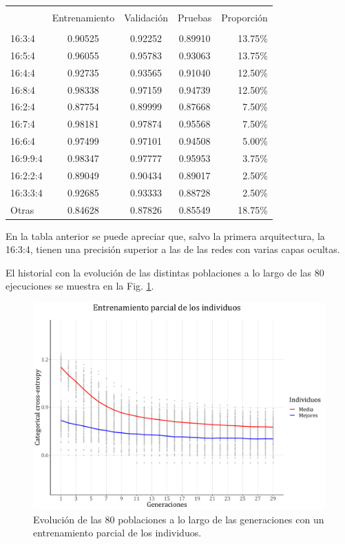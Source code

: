 \documentclass[spanish,a4paper,12pt,twoside]{report}
\begin{document}
\begin{center}
   \label{table}
  \begin{tabular}{l c c c r}
    \hline \\ [-2ex]
    & Entrenamiento & Validación & Pruebas & Proporción \\ [0.5ex]
    \hline \\ [-1ex]
    16:3:4 & 0.90525 & 0.92252 & 0.89910 & 13.75\% \\
    16:5:4 & 0.96055 & 0.95783 & 0.93063 & 13.75\% \\
    16:4:4 & 0.92735 & 0.93565 & 0.91040 & 12.50\% \\
    16:8:4 & 0.98338 & 0.97159 & 0.94739 & 12.50\% \\
    16:2:4 & 0.87754 & 0.89999 & 0.87668 & 7.50\% \\
    16:7:4 & 0.98181 & 0.97874 & 0.95568 & 7.50\% \\
    16:6:4 & 0.97499 & 0.97101 & 0.94508 & 5.00\% \\
    16:9:9:4 & 0.98347 & 0.97777 & 0.95953 & 3.75\% \\
    16:2:2:4 & 0.89049 & 0.90434 & 0.89017 & 2.50\% \\
    16:3:3:4 & 0.92685 & 0.93333 & 0.88728 & 2.50\% \\
    Otras & 0.84628 & 0.87826 & 0.85549 & 18.75\% \\ [1ex]
    \hline
  \end{tabular}
\end{center} \par
  En la tabla anterior se puede apreciar que, salvo la primera arquitectura, la 16:3:4, tienen una precisión superior a las de las redes con varias capas ocultas. \par
  El historial con la evolución de las distintas poblaciones a lo largo de las 80 ejecuciones se muestra en la Fig. \ref{fig:21}. \par
  \begin{figure}[H]
    \centering
    \includegraphics[width = 1\textwidth]{resources/Fig21.pdf}
    \caption{Evolución de las 80 poblaciones a lo largo de las generaciones con un entrenamiento parcial de los individuos.}
    \label{fig:21}
  \end{figure} \vfill
\end{document}
